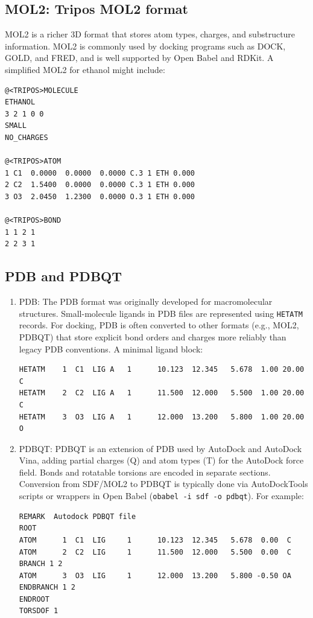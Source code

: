 \documentclass[12pt, a4paper]{article}
\begin{document}
\subsection{MOL2: Tripos MOL2 format}

MOL2 is a richer 3D format that stores atom types, charges, and substructure information. MOL2 is commonly used by docking programs such as DOCK, GOLD, and FRED, and is well supported by Open Babel and RDKit. A simplified MOL2 for ethanol might include:

\begin{verbatim}
@<TRIPOS>MOLECULE
ETHANOL
3 2 1 0 0
SMALL
NO_CHARGES

@<TRIPOS>ATOM
1 C1  0.0000  0.0000  0.0000 C.3 1 ETH 0.000
2 C2  1.5400  0.0000  0.0000 C.3 1 ETH 0.000
3 O3  2.0450  1.2300  0.0000 O.3 1 ETH 0.000

@<TRIPOS>BOND
1 1 2 1
2 2 3 1
\end{verbatim}

\subsection{PDB and PDBQT}

\begin{enumerate}
\item PDB: The PDB format was originally developed for macromolecular structures.\cite{CH6_Berman2000} Small-molecule ligands in PDB files are represented using \verb|HETATM| records. For docking, PDB is often converted to other formats (e.g., MOL2, PDBQT) that store explicit bond orders and charges more reliably than legacy PDB conventions. A minimal ligand block:

\begin{verbatim}
HETATM    1  C1  LIG A   1      10.123  12.345   5.678  1.00 20.00           C
HETATM    2  C2  LIG A   1      11.500  12.000   5.500  1.00 20.00           C
HETATM    3  O3  LIG A   1      12.000  13.200   5.800  1.00 20.00           O
\end{verbatim}


\item PDBQT: PDBQT is an extension of PDB used by AutoDock and AutoDock Vina, adding partial charges (Q) and atom types (T) for the AutoDock force field. Bonds and rotatable torsions are encoded in separate sections. Conversion from SDF/MOL2 to PDBQT is typically done via AutoDockTools scripts or wrappers in Open Babel (\verb|obabel -i sdf -o pdbqt|).
 For example:

\begin{verbatim}
REMARK  Autodock PDBQT file
ROOT
ATOM      1  C1  LIG     1      10.123  12.345   5.678  0.00  C 
ATOM      2  C2  LIG     1      11.500  12.000   5.500  0.00  C 
BRANCH 1 2
ATOM      3  O3  LIG     1      12.000  13.200   5.800 -0.50 OA
ENDBRANCH 1 2
ENDROOT
TORSDOF 1
\end{verbatim}
\end{enumerate}
\end{document}
